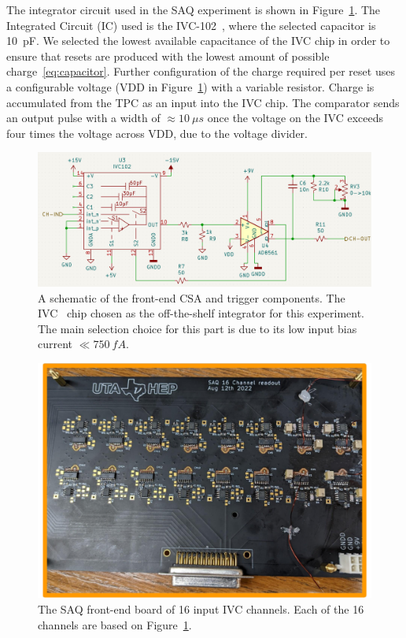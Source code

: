 The integrator circuit used in the SAQ experiment is shown in Figure~\ref{fig:saq_circuit_kicad}.
The Integrated Circuit (IC) used is the IVC-102~\citep{ivc_datasheet}, where the selected capacitor is 10~\unit{pF}.
We selected the lowest available capacitance of the IVC chip in order to ensure that resets are produced with the lowest amount of possible charge~\ref{eq:capacitor}.
Further configuration of the charge required per reset uses a configurable voltage (VDD in Figure~\ref{fig:saq_circuit_kicad}) with a variable resistor.
Charge is accumulated from the TPC as an input into the IVC chip.
The comparator sends an output pulse with a width of $\approx 10~\unit{\mu s}$ once the voltage on the IVC exceeds four times the voltage across VDD, due to the voltage divider.

\begin{figure}[]
\centering
\includegraphics[width=\textwidth]{images/saq_integrator_circuit.png}
\caption{
A schematic of the front-end CSA and trigger components.
The IVC~\citep{ivc_datasheet} chip chosen as the off-the-shelf integrator for this experiment.
The main selection choice for this part is due to its low input bias current $\ll 750~\unit{fA}$.
}
\label{fig:saq_circuit_kicad}
\end{figure}

\begin{figure}[]
\centering
\includegraphics[width=\textwidth]{images/SAQ_16_ivc_readout_board.pdf}
\caption{The SAQ front-end board of 16 input IVC channels.
Each of the 16 channels are based on Figure~\ref{fig:saq_circuit_kicad}.
}
\label{fig:saq_readout_board}
\end{figure}

